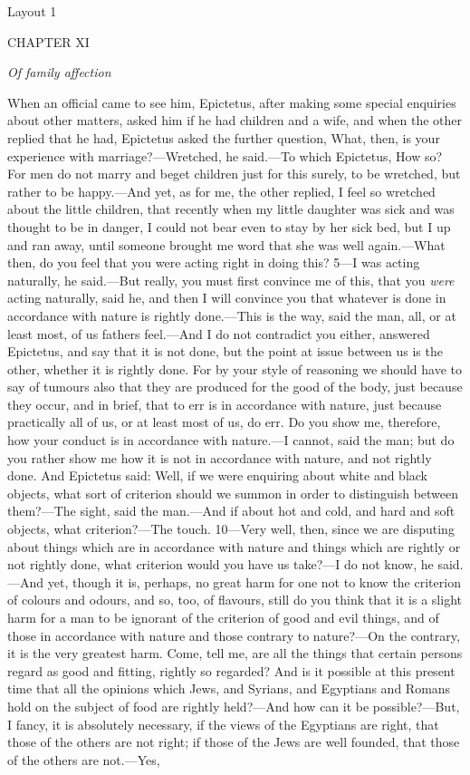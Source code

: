 

Layout 1

CHAPTER XI

\emph{Of family affection}

When an official came to see him, Epictetus, after making some special enquiries about other matters, asked him if he had children and a wife, and when the other replied that he had, Epictetus asked the further question, What, then, is your experience with marriage?—Wretched, he said.—To which Epictetus, How so? For men do not marry and beget children just for this surely, to be wretched, but rather to be happy.—And yet, as for me, the other replied, I feel so wretched about the little children, that recently when my little daughter was sick and was thought to be in danger, I could not bear even to stay by her sick bed, but I up and ran away, until someone brought me word that she was well again.—What then, do you feel that you were acting right in doing this? 5—I was acting naturally, he said.—But really, you must first convince me of this, that you \emph{were} acting naturally, said he, and then I will convince you that whatever is done in accordance with nature is rightly done.—This is the way, said the man, all, or at least most, of us fathers feel.—And I do not contradict you either, answered Epictetus, and say that it is not done, but the point at issue between us is the other, whether it is rightly done. For by your style of reasoning we should have to say of tumours also that they are produced for the good of the body, just because they occur, and in brief, that to err is in accordance with nature, just because practically all of us, or at least most of us, do err. Do you show me, therefore, how your conduct is in accordance with nature.—I cannot, said the man; but do you rather show me how it is not in accordance with nature, and not rightly done. And Epictetus said: Well, if we were enquiring about white and black objects, what sort of criterion should we summon in order to distinguish between them?—The sight, said the man.—And if about hot and cold, and hard and soft objects, what criterion?—The touch. 10—Very well, then, since we are disputing about things which are in accordance with nature and things which are rightly or not rightly done, what criterion would you have us take?—I do not know, he said.—And yet, though it is, perhaps, no great harm for one not to know the criterion of colours and odours, and so, too, of flavours, still do you think that it is a slight harm for a man to be ignorant of the criterion of good and evil things, and of those in accordance with nature and those contrary to nature?—On the contrary, it is the very greatest harm. Come, tell me, are all the things that certain persons regard as good and fitting, rightly so regarded? And is it possible at this present time that all the opinions which Jews, and Syrians, and Egyptians and Romans hold on the subject of food are rightly held?—And how can it be possible?—But, I fancy, it is absolutely necessary, if the views of the Egyptians are right, that those of the others are not right; if those of the Jews are well founded, that those of the others are not.—Yes, 